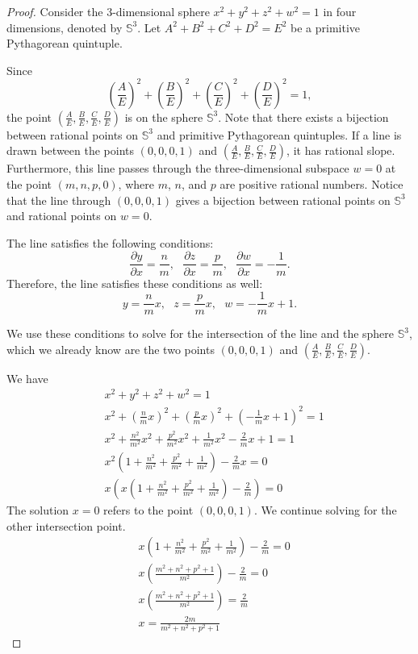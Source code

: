 \documentclass[12pt,table]{article}
\theoremstyle{definition}
\theoremstyle{remark}
\newcommand{\Sss}{\mathbb S}
\numberwithin{equation}{section}
\begin{document}
\begin{proof}
Consider the $3$-dimensional
sphere $x^2 + y^2 + z^2 +w^2 =1$
in four dimensions,
denoted by $\Sss^3$.
Let $A^2 +B^2 +C^2 + D^2 = E^2$ be a primitive Pythagorean quintuple.


Since 
\[
     \left(\frac{A}{E}\right)^2 +\left(\frac{B}{E}\right)^2+
     \left(\frac{C}{E}\right)^2+\left(\frac{D}{E}\right)^2 = 1,
\]
the point $(\frac{A}{E},\frac{B}{E},\frac{C}{E},\frac{D}{E})$ 
is on the sphere $\Sss^3$. 
Note that there exists a bijection between rational 
points on $\Sss^3$ and primitive Pythagorean quintuples.
If a line is drawn between the points $(0,0,0,1)$ and
$(\frac{A}{E},\frac{B}{E},\frac{C}{E},\frac{D}{E})$,
it has rational slope.
Furthermore, 
this line passes through the three-dimensional 
subspace $w=0$ at the point $(m,n,p,0)$,
where 
$m$, $n$, and $p$ are positive rational numbers. 
Notice that the line through $(0,0,0,1)$ gives a
bijection between rational
points on $\Sss^3$ and rational points on $w=0$.


The line satisfies the following conditions:
\[
     \frac{\partial y}{\partial x} =\frac{n}{m} ,\:\:\: 
     \frac{\partial z}{\partial x}=\frac{p}{m}, \:\:\:
     \frac{\partial w}{\partial x}=-\frac{1}{m}.
\]
Therefore, the line satisfies these conditions as well:
\[
      y=\frac{n}{m}x , \:\:\: z=\frac{p}{m}x, \:\:\:w=-\frac{1}{m}x+1.
\]

We use these conditions to solve for the intersection
 of the line and the sphere $\Sss^3$, which 
we already know are the two points $(0,0,0,1)$ and 
 $(\frac{A}{E},\frac{B}{E},\frac{C}{E},\frac{D}{E})$.


We have
\begin{align*}
     & x^2 + y^2 + z^2 +w^2 =1
\\
     & x^2 + \left(\frac{n}{m}x\right)^2 + 
        \left(\frac{p}{m}x\right)^2 
        +\left(-\frac{1}{m}x+1\right)^2 = 1
\\
     & x^2 + \frac{n^2}{m^2}x^2 + \frac{p^2}{m^2}x^2
        +\frac{1}{m^2}x^2-\frac{2}{m}x+1=1
\\
     & x^2\left(1 + \frac{n^2}{m^2} + \frac{p^2}{m^2} 
       +\frac{1}{m^2}\right)-\frac{2}{m}x = 0
\\
     & x\left(x\left(1 + \frac{n^2}{m^2} + \frac{p^2}{m^2} 
        +\frac{1}{m^2}\right)-\frac{2}{m}\right) = 0
\end{align*}
The solution $x=0$ refers to the point $(0,0,0,1)$.
We continue solving for the other intersection point.
\begin{align*}
     & x\left(1 + \frac{n^2}{m^2} + \frac{p^2}{m^2} 
      +\frac{1}{m^2}\right)-\frac{2}{m}=0     
\\
     & x\left(\frac{m^2 + n^2 + p^2 +1}{m^2}\right)-\frac{2}{m}=0     
\\
     & x\left(\frac{m^2 + n^2 + p^2 +1}{m^2}\right)=\frac{2}{m}     
\\
     & x = \frac{2m}{m^2 + n^2 + p^2 +1}     
\end{align*}




\end{proof}
\end{document}
